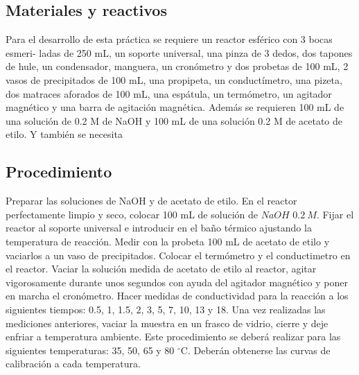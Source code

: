     \subsection{Materiales y reactivos}
    
    Para el desarrollo de esta práctica se requiere un reactor esférico con 3 bocas esmeri-
    ladas de 250 mL, un soporte universal, una pinza de 3 dedos, dos tapones de hule, 
    un condensador, manguera, un cronómetro y dos probetas de 100 mL, 2 vasos de 
    precipitados de 100 mL, una propipeta, un conductímetro, una pizeta, dos matraces 
    aforados de 100 mL, una espátula, un termómetro, un agitador magnético y una barra 
    de agitación magnética. Además se requieren 100 mL de una solución de 0.2 M de NaOH 
    y 100 mL de una solución 0.2 M de acetato de etilo. Y también se necesita



    \subsection{Procedimiento}
    
    Preparar las soluciones de NaOH y de acetato de etilo. En el reactor perfectamente
    limpio y seco, colocar 100 mL de solución de $NaOH$ $0.2\: M $. Fijar el reactor al soporte
    universal e introducir en el baño térmico ajustando la temperatura de reacción. Medir
    con la probeta 100 mL de acetato de etilo y vaciarlos a un vaso de precipitados. Colocar
    el termómetro y el conductimetro en el reactor. Vaciar la solución medida de acetato
    de etilo al reactor, agitar vigorosamente durante unos segundos con ayuda del agitador
    magnético y poner en marcha el cronómetro. Hacer medidas de conductividad para la
    reacción a los siguientes tiempos: 0.5, 1, 1.5, 2, 3, 5, 7, 10, 13 y 18. Una vez realizadas
    las mediciones anteriores, vaciar la muestra en un frasco de vidrio, cierre y deje enfriar
    a temperatura ambiente. Este procedimiento se deberá realizar para las siguientes
    temperaturas: 35, 50, 65 y 80 $^{\circ}$C. Deberán obtenerse las curvas de calibración a cada
    temperatura.

